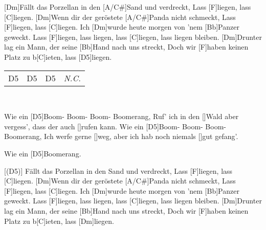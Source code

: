 \begin{guitar}
	\begin{highlightbar}
		[Dm]Fällt das Porzellan in den [A/C#]Sand und verdreckt,
		Lass [F]liegen, lass [C]liegen.
		[Dm]Wenn dir der geröstete [A/C#]Panda nicht schmeckt,
		Lass [F]liegen, lass [C]liegen.
		Ich [Dm]wurde heute morgen von 'nem [Bb]Panzer geweckt.
		Lass [F]liegen, lass liegen, lass [C]liegen, lass liegen bleiben.
		[Dm]Drunter lag ein Mann, der seine [Bb]Hand nach uns streckt,
		Doch wir [F]haben keinen Platz zu b[C]ieten, lass [D5]liegen.
	\end{highlightbar}
	
	\songsection{Instrumental}
	{\footnotesize\begin{tabular}{|l|l|l|l|}
			D5 & D5 & D5 & \textit{N.C.}
	\end{tabular} \optionalChord{(x4)}}
	\vspace{-2.875em} \\ \hfill {} \vspace{-0.125em}
	
	\begin{slimhighlightbar}
		 \optionalChord{(x2)}
		Wie ein [D5]Boom- Boom- Boom- Boomerang,
		Ruf' ich in den []Wald aber vergess', dass der auch []rufen kann.
		Wie ein [D5]Boom- Boom- Boom- Boomerang,
		Ich werfe gerne []weg, aber ich hab noch niemals []gut gefang'.
	\end{slimhighlightbar}
	
	Wie ein [D5]Boomerang.
	
	\begin{highlightbar}
		\songsection{Refrain}
		[(D5)] Fällt das Porzellan in den Sand und verdreckt,
		Lass [F]liegen, lass [C]liegen.
		[Dm]Wenn dir der geröstete [A/C#]Panda nicht schmeckt,
		Lass [F]liegen, lass [C]liegen.
		Ich [Dm]wurde heute morgen von 'nem [Bb]Panzer geweckt.
		Lass [F]liegen, lass liegen, lass [C]liegen, lass liegen bleiben.
		[Dm]Drunter lag ein Mann, der seine [Bb]Hand nach uns streckt,
		Doch wir [F]haben keinen Platz zu b[C]ieten, lass [Dm]liegen.
	\end{highlightbar}
\end{guitar}